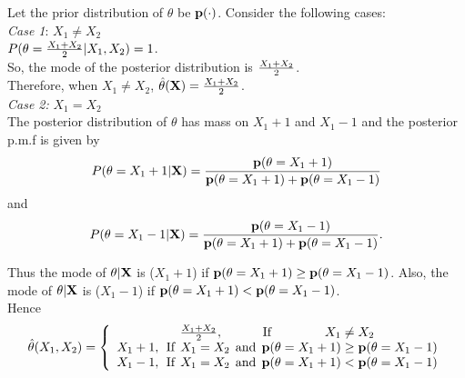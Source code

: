 \documentclass[12pt]{article}
\def\frac#1#2{{{#1}\over{#2}}}
\def\p   {\hbox{\bf p}}
\def\X   {\hbox{\bf X}}
\begin{document}
Let the prior distribution of $\theta$ be $\p(\cdot)$. 
Consider the following cases:\\

\emph{Case 1}: $X_1\neq X_2$ \\

$P(\theta=\frac{X_1+X_2}{2}|X_1,X_2)=1$. \\So, the mode of the posterior distribution is $\frac{X_1+X_2}{2}$. \\Therefore, when $X_1\neq X_2$, $\hat{\theta}(\X)=\frac{X_1+X_2}{2}$. \\

\emph{Case 2:} $X_1=X_2$\\

The posterior distribution of $\theta$ has mass on $X_1+1$ and $X_1-1$ and the posterior p.m.f is given by
\begin{equation}
P(\theta=X_1+1|\X)=\frac{\p(\theta=X_1+1)}{\p(\theta=X_1+1)+\p(\theta=X_1-1)}
\end{equation}
and 
\begin{equation}
P(\theta=X_1-1|\X)=\frac{\p(\theta=X_1-1)}{\p(\theta=X_1+1)+\p(\theta=X_1-1)}.
\end{equation}


Thus the mode of $\theta|\X$ is ($X_1+1$) if $\p(\theta=X_1+1)\geq \p(\theta=X_1-1)$. Also, the mode of $\theta|\X$ is ($X_1-1$) if $\p(\theta=X_1+1) < \p(\theta=X_1-1)$. \\
Hence
$$
\hat{\theta}(X_1,X_2)=\left\{\begin{array}{c}
\frac{X_1+X_2}{2}, \:\:\:\:\:\:\:\:\:\:\:\:\:\:\mbox{If}\:\:\:\:\:\:\:\:\:\:\:\:\:\:\:\:\:\:\:X_1\neq X_2\\
X_1+1,\:\:\mbox{If}\:\:X_1=X_2\:\:\mbox{and}\:\:\p(\theta=X_1+1)\geq \p(\theta=X_1-1)\\
X_1-1,\:\:\mbox{If}\:\:X_1=X_2\:\:\mbox{and}\:\:\p(\theta=X_1+1)<\p(\theta=X_1-1)\\
\end{array}
\right.
$$
\end{document}

